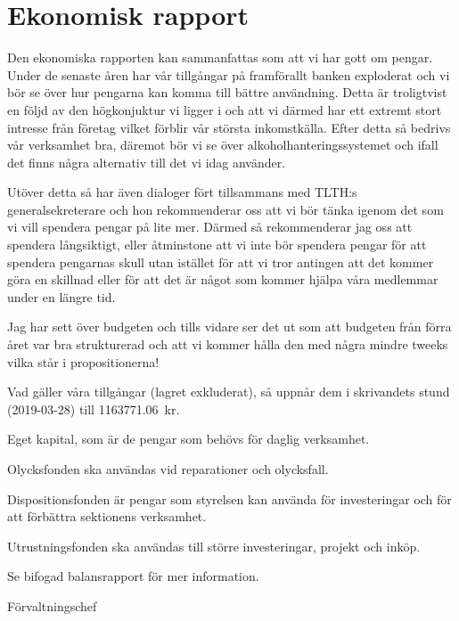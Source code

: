 \documentclass[../_main/handlingar.tex]{subfiles}
\begin{document}
\section{Ekonomisk rapport}

Den ekonomiska rapporten kan sammanfattas som att vi har gott om pengar. Under de senaste åren har vår tillgångar på framförallt banken exploderat och vi bör se över hur pengarna kan komma till bättre användning. Detta är troligtvist en följd av den högkonjuktur vi ligger i och att vi därmed har ett extremt stort intresse från företag vilket förblir vår största inkomstkälla. Efter detta så bedrivs vår verksamhet bra, däremot bör vi se över alkoholhanteringssystemet och ifall det finns några alternativ till det vi idag använder.


Utöver detta så har även dialoger fört tillsammans med TLTH:s generalsekreterare och hon rekommenderar oss att vi bör tänka igenom det som vi vill spendera pengar på lite mer. 
Därmed så rekommenderar jag oss att spendera långsiktigt, eller åtminstone att vi inte bör spendera pengar för att spendera pengarnas skull utan istället för att vi tror antingen att det kommer göra en skillnad eller för att det är något som kommer hjälpa våra medlemmar under en längre tid.

Jag har sett över budgeten och tills vidare ser det ut som att budgeten från förra året var bra strukturerad och att vi kommer hålla den med några mindre tweeks vilka står i propositionerna!

Vad gäller våra tillgångar (lagret exkluderat), så uppnår dem i skrivandets stund (2019-03-28) till \SI{1 163 771,06}{kr}. 
\begin{dashlist}
	\item Eget kapital, som är de pengar som behövs för daglig verksamhet.
	\item Olycksfonden ska användas vid reparationer och olycksfall.
	\item Dispositionsfonden är pengar som styrelsen kan använda för investeringar och för att förbättra sektionens verksamhet.
	\item Utrustningsfonden ska användas till större investeringar, projekt och inköp.
\end{dashlist}

Se bifogad balansrapport för mer information. 

\begin{signatures}{1}
	\mvh
	\signature{\fvc}{Förvaltningschef}
\end{signatures}
\end{document}
